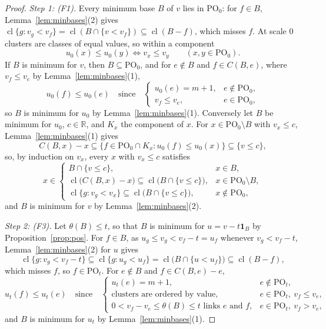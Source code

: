 \documentclass[11pt]{article}
\newcommand{\R}{\mathbb R}
\newcommand{\cl}{\operatorname{cl}}
\newcommand{\PO}{\mathrm{PO}}
\begin{document}
\begin{proof}
\emph{Step 1: (F1).}  Every minimum base $B$ of $v$ lies in $\PO_0$: for $f\in B$,
Lemma~\ref{lem:minbases}(2) gives $\cl\{g:v_g<v_f\}=\cl(B\cap\{v<v_f\})\subseteq\cl(B-f)$,
which misses $f$.  At scale $0$ clusters are classes of equal values, so within a
component
\[
  u_0(x)\le u_0(y)\iff v_x\le v_y\qquad(x,y\in\PO_0).
\]
If $B$ is minimum for $v$, then $B\subseteq\PO_0$, and for $e\notin B$ and
$f\in C(B,e)$, where $v_f\le v_e$ by Lemma~\ref{lem:minbases}(1),
\[
  u_0(f)\le u_0(e)\quad\text{since}\quad
  \begin{cases}
    u_0(e)=m+1,&e\notin\PO_0,\\
    v_f\le v_e,&e\in\PO_0,
  \end{cases}
\]
so $B$ is minimum for $u_0$ by Lemma~\ref{lem:minbases}(1).  Conversely let $B$ be
minimum for $u_0$, $c\in\R$, and $K_x$ the component of $x$.  For
$x\in\PO_0\setminus B$ with $v_x\le c$, Lemma~\ref{lem:minbases}(1) gives
\[
  C(B,x)-x\subseteq\{f\in\PO_0\cap K_x:u_0(f)\le u_0(x)\}\subseteq\{v\le c\},
\]
so, by induction on $v_x$, every $x$ with $v_x\le c$ satisfies
\[
  x\in\begin{cases}
    B\cap\{v\le c\},&x\in B,\\
    \cl\bigl(C(B,x)-x\bigr)\subseteq\cl\bigl(B\cap\{v\le c\}\bigr),&x\in\PO_0\setminus B,\\
    \cl\{g:v_g<v_x\}\subseteq\cl\bigl(B\cap\{v\le c\}\bigr),&x\notin\PO_0,
  \end{cases}
\]
and $B$ is minimum for $v$ by Lemma~\ref{lem:minbases}(2).

\emph{Step 2: (F3).}  Let $\theta(B)\le t$, so that $B$ is minimum for
$u=v-t\mathbf 1_B$ by Proposition~\ref{prop:pos}.  For $f\in B$, as
$u_g\le v_g<v_f-t=u_f$ whenever $v_g<v_f-t$, Lemma~\ref{lem:minbases}(2) for $u$
gives
\[
  \cl\{g:v_g<v_f-t\}\subseteq\cl\{g:u_g<u_f\}=\cl\bigl(B\cap\{u<u_f\}\bigr)\subseteq\cl(B-f),
\]
which misses $f$, so $f\in\PO_t$.  For $e\notin B$ and $f\in C(B,e)-e$,
\[
  u_t(f)\le u_t(e)\quad\text{since}\quad
  \begin{cases}
    u_t(e)=m+1,&e\notin\PO_t,\\
    \text{clusters are ordered by value},&e\in\PO_t,\ v_f\le v_e,\\
    0<v_f-v_e\le\theta(B)\le t\text{ links }e\text{ and }f,&e\in\PO_t,\ v_f>v_e,
  \end{cases}
\]
and $B$ is minimum for $u_t$ by Lemma~\ref{lem:minbases}(1).


\end{proof}
\end{document}
